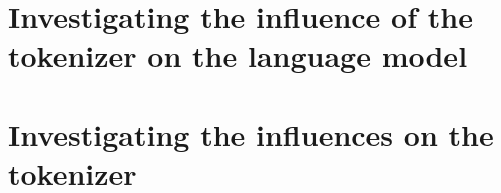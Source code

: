 



\section{Investigating the influence of the tokenizer on the language model}

\section{Investigating the influences on the tokenizer}




